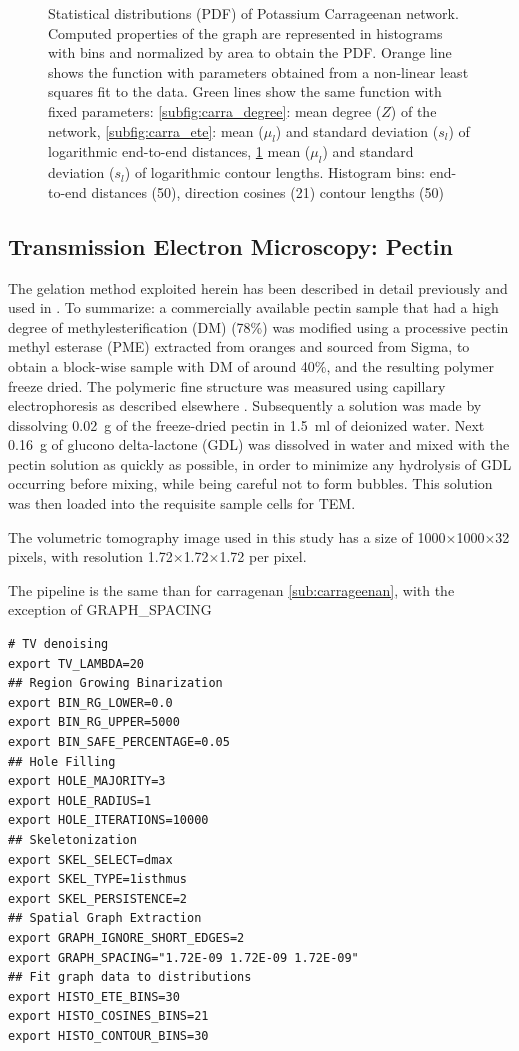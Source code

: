 \begin{figure}[H]
\begin{subfigure}{0.5\textwidth}
    \label{subfig:carra_contour}
  \end{subfigure}
  \caption{Statistical distributions (PDF) of Potassium Carrageenan network. Computed properties of the graph are represented in histograms with bins and normalized by area to obtain the PDF. Orange line shows the function with parameters obtained from a non-linear least squares fit to the data.
    Green lines show the same function with fixed parameters: \ref{subfig:carra_degree}: mean degree ($Z$) of the network, \ref{subfig:carra_ete}: mean ($\mu_l$) and standard deviation ($s_l$) of logarithmic end-to-end distances,
  \ref{subfig:carra_contour} mean ($\mu_l$) and standard deviation ($s_l$) of logarithmic contour lengths.
Histogram bins: end-to-end distances (50), direction cosines (21) contour lengths (50) }
  \label{fig:carra_thin}
\end{figure}

\subsection{Transmission Electron Microscopy: Pectin}%
\label{sub:Pectin}

The gelation method exploited herein has been described in detail previously \cite{mansel_zooming_2015} and used in \cite{hernandez-cerdan_structural_2018-2}.
To summarize: a commercially available pectin sample that had a high degree of methylesterification (DM) (78\%) was modified using a processive pectin methyl esterase (PME) extracted from oranges and sourced from Sigma, to obtain a block-wise sample with DM of around 40\%, and the resulting polymer freeze dried. The polymeric fine structure was measured using capillary electrophoresis as described elsewhere \cite{mansel_zooming_2015}. Subsequently a solution was made by dissolving \SI{0.02}{\g} of the freeze-dried pectin in \SI{1.5}{\ml} of deionized water. Next \SI{0.16}{\g} of glucono delta-lactone (GDL) was dissolved in water and mixed with the pectin solution as quickly as possible, in order to minimize any hydrolysis of GDL occurring before mixing, while being careful not to form bubbles. This solution was then loaded into the requisite sample cells for \gls{TEM}.

The volumetric tomography image used in this study has a size of 1000$\times$1000$\times$32 pixels, with resolution 1.72$\times$1.72$\times$1.72 \nm per pixel.

The pipeline is the same than for carragenan \autoref{sub:carrageenan}, with the exception of GRAPH\_SPACING
\begin{verbatim}
# TV denoising
export TV_LAMBDA=20
## Region Growing Binarization
export BIN_RG_LOWER=0.0
export BIN_RG_UPPER=5000
export BIN_SAFE_PERCENTAGE=0.05
## Hole Filling
export HOLE_MAJORITY=3
export HOLE_RADIUS=1
export HOLE_ITERATIONS=10000
## Skeletonization
export SKEL_SELECT=dmax
export SKEL_TYPE=1isthmus
export SKEL_PERSISTENCE=2
## Spatial Graph Extraction
export GRAPH_IGNORE_SHORT_EDGES=2
export GRAPH_SPACING="1.72E-09 1.72E-09 1.72E-09"
## Fit graph data to distributions
export HISTO_ETE_BINS=30
export HISTO_COSINES_BINS=21
export HISTO_CONTOUR_BINS=30
\end{verbatim}


